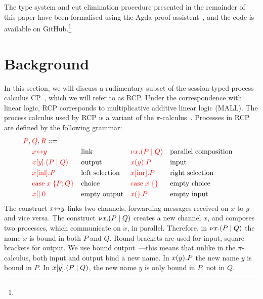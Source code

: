 \documentclass[a4paper,UKenglish]{lipics-v2016}
\begin{document}
The type system and cut elimination procedure presented in the remainder of this
paper have been formalised using the Agda proof assistent~\cite{norell2009}, and
the code is available on GitHub.\footnote{
}

\section{Background}
In this section, we will discuss a rudimentary subset of the session-typed
process calculus CP~\cite{wadler2012}, which we will refer to as RCP.
Under the correspondence with linear logic, RCP corresponds to multiplicative
additive linear logic (MALL).
The process calculus used by RCP is a variant of the
$\pi$-calculus~\cite{milner1992}. Processes in RCP are defined by the following
grammar:
\[
  \begin{aligned}
    \red{P},\:&\red{Q},\red{R} ::=\\
    & \red{\link{x}{y}}           &&\text{link}
    &&\red{\cut{x}(P \mid Q)}     &&\text{parallel composition}\\
    & \red{\send{x}{y}(P \mid Q)} &&\text{output}
    &&\red{\recv{x}{y}P}          &&\text{input}\\
    & \red{\inl{x}P}              &&\text{left selection}
    &&\red{\inr{x}P}              &&\text{right selection}\\
    & \red{\case{x}{P}{Q}}        &&\text{choice}
    &&\red{\case{x}{}{}}          &&\text{empty choice}\\
    & \red{\send{x}{}0}           &&\text{empty output}
    &&\red{\recv{x}{}P}           &&\text{empty input}\\
  \end{aligned}
\]
The construct ${x{\leftrightarrow}y}$ links two channels, forwarding messages received on
$x$ to $y$ and vice versa.
%
The construct ${\nu x.}{(P \mid Q)}$ creates a new channel $x$, and composes two
processes, which communicate on $x$, in parallel.
Therefore, in ${\nu x.}{(P \mid Q)}$ the name $x$ is bound in both $P$ and $Q$. 
%
Round brackets are used for input, square brackets for output.
We use bound output~\cite{sangiorgi1996}---this means that unlike in the
$\pi$-calculus, both input and output bind a new name.
In ${x(y).}P$ the new name $y$ is bound in $P$.
In ${x[y].}{(P \mid Q)}$, the new name $y$ is only bound in $P$, not in $Q$.
\end{document}
